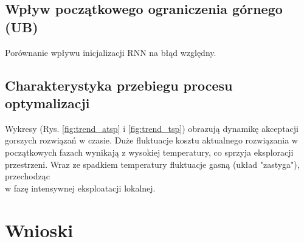 \documentclass[conference]{IEEEtran}
\begin{document}
        \subsection{Wpływ początkowego ograniczenia górnego (UB)}
            Porównanie wpływu inicjalizacji RNN na błąd względny.
            \begin{table}[H]
                \centering
                \caption{Wpływ rozwiązania startowego (ftv170 oraz gr229)}
            \end{table}
        \subsection{Charakterystyka przebiegu procesu optymalizacji}
            Wykresy (Rys. \ref{fig:trend_atsp} i \ref{fig:trend_tsp}) obrazują dynamikę akceptacji gorszych rozwiązań w czasie. Duże fluktuacje kosztu aktualnego rozwiązania w początkowych fazach wynikają z wysokiej temperatury, co sprzyja eksploracji przestrzeni. Wraz ze spadkiem temperatury fluktuacje gasną (układ "zastyga"), przechodząc \\ w fazę intensywnej eksploatacji lokalnej.
            

    \section{Wnioski}
\end{document}
